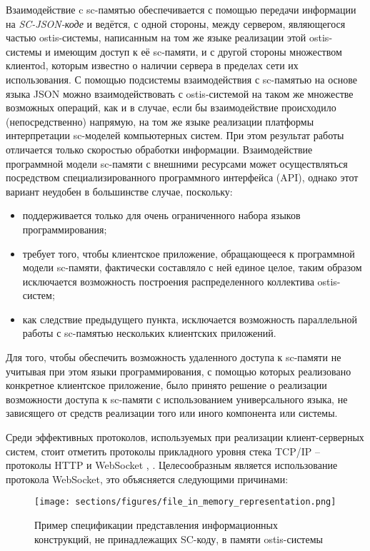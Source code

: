 Взаимодействие c sc-памятью обеспечивается с помощью передачи информации на \textit{SC-JSON-коде} и ведётся, с одной стороны, между сервером, являющегося частью ostis-системы, написанным на том же языке реализации этой ostis-системы и имеющим доступ к её sc-памяти, и с другой стороны множеством клиентоd, которым известно о наличии сервера в пределах сети их использования. С помощью подсистемы взаимодействия с sc-памятью на основе языка JSON можно взаимодействовать с ostis-системой на таком же множестве возможных операций, как и в случае, если бы взаимодействие происходило (непосредственно) напрямую, на том же языке реализации платформы интерпретации sc-моделей компьютерных систем. При этом результат работы отличается только скоростью обработки информации.
Взаимодействие программной модели sc-памяти с внешними ресурсами может осуществляться посредством специализированного программного интерфейса (API), однако этот вариант неудобен в большинстве случае, поскольку:
    \begin{itemize}
        \item поддерживается только для очень ограниченного набора языков программирования;
        \item требует того, чтобы клиентское приложение, обращающееся к программной модели sc-памяти, фактически составляло с ней единое целое, таким образом исключается возможность построения распределенного коллектива ostis-систем;
        \item как следствие предыдущего пункта, исключается возможность параллельной работы с sc-памятью нескольких клиентских приложений.
   \end{itemize}
Для того, чтобы обеспечить возможность удаленного доступа к sc-памяти не учитывая при этом языки программирования, с помощью которых реализовано конкретное клиентское приложение, было принято решение о реализации возможности доступа к sc-памяти с использованием универсального языка, не зависящего от средств реализации того или иного компонента или системы.

Среди эффективных протоколов, используемых при реализации клиент-серверных систем, стоит отметить протоколы прикладного уровня стека TCP/IP -- протоколы HTTP и WebSocket \cite{webockets_overview}, \cite{naik2020study}. Целесообразным является использование протокола WebSocket, это объясняется следующими причинами:

\begin{figure*}[htbp]
  \center
  \texttt{[image: sections/figures/file\_in\_memory\_representation.png]}
  \caption{Пример спецификации представления информационных конструкций, не принадлежащих SC-коду, в памяти ostis-системы}
  \label{fig:file_in_memory_representation}
\end{figure*}


